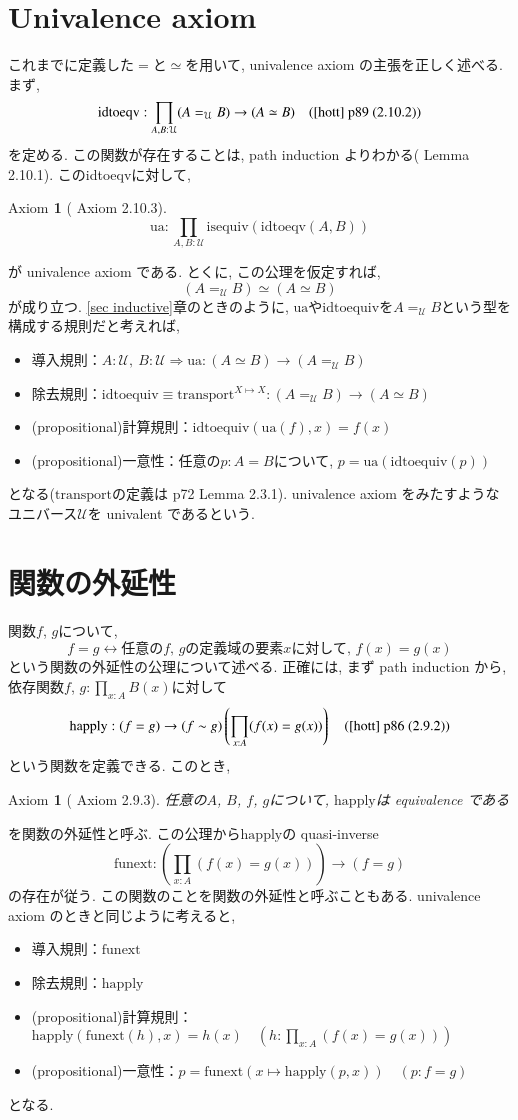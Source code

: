\documentclass[11pt]{jsreport}
\theoremstyle{mystyle}
\newtheorem{axi}[df]{$\textrm{Axiom}$}
\newcommand{\baxi}{\begin{shadebox} \begin{axi}}
\newcommand{\eaxi}{\end{axi} \end{shadebox}}
\newcommand{\Lra}{\Longrightarrow}
\newcommand{\lra}{\leftrightarrow}
\newcommand{\U}{\mathcal{U}}
\newcommand{\tp}{\textrm{transport}}
\newcommand{\iseq}{\textrm{isequiv}}
\newcommand{\0}{\textbf{0}}
\newcommand{\fune}{\textrm{funext}}
\newcommand{\happ}{\textrm{happly}}
\newcommand{\ua}{\textrm{ua}}
\newcommand{\ide}{\textrm{idtoequiv}}
\begin{document}
\section{Univalence axiom} \label{sec ua}
これまでに定義した$=$と$\simeq$を用いて, univalence axiom の主張を正しく述べる. まず, 
\[
  \textrm{idtoeqv} : \prod_{A, B : \U} (A =_{\U} B) \to (A \simeq B)
    \quad (\text{\cite{hott} p89 (2.10.2)})
\]
を定める. この関数が存在することは, path induction よりわかる(\cite{hott} Lemma 2.10.1). このidtoeqvに対して, 
\begin{shadebox}
\begin{axi}[\cite{hott} Axiom 2.10.3]
  \[
    \textrm{ua} : \prod_{A, B : \U} \iseq(\textrm{idtoeqv}(A, B))
  \]
\end{axi}
\end{shadebox}
が univalence axiom である. とくに, この公理を仮定すれば, 
\[
  (A =_{\U} B) \simeq (A \simeq B)
\]
が成り立つ. \ref{sec inductive}章のときのように, $\ua$や$\ide$を$A =_{\U} B$という型を構成する規則だと考えれば, 
\begin{itemize}
  \item 導入規則：$A : \U,\ B: \U \Lra \ua : (A \simeq B) \to (A =_{\U} B)$
  \item 除去規則：$\ide \equiv \tp^{X \mapsto X} : (A =_{\U} B) \to (A \simeq B)$
  \item (propositional)計算規則：$\ide (\ua (f), x) = f(x)$
  \item (propositional)一意性：任意の$p : A = B$について, $p = \ua (\ide (p))$
\end{itemize}
となる($\tp$の定義は\cite{hott} p72 Lemma 2.3.1). univalence axiom をみたすようなユニバース$\U$を univalent であるという.  
\section{関数の外延性} \label{sec funext}
関数$f$, $g$について, 
\[
  f = g \lra \text{任意の$f$, $g$の定義域の要素$x$に対して, $f(x) = g(x)$}
\]
という関数の外延性の公理について述べる. 正確には, まず path induction から, 
依存関数$f$, $g : \prod_{x : A} B(x)$に対して
\[
  \happ : (f = g) \to (f \sim g) \left( \prod_{x : A} (f(x) = g(x))\right)
    \quad (\text{\cite{hott} p86 (2.9.2)})
\]
という関数を定義できる. このとき, 
\baxi[\cite{hott} Axiom 2.9.3]
  任意の$A$, $B$, $f$, $g$について, $\happ$は equivalence である
\eaxi
を関数の外延性と呼ぶ. この公理から$\happ$の quasi-inverse
\[
  \textrm{funext} : \left( \prod_{x : A} (f(x) = g(x)) \right) \to (f = g)
\]
の存在が従う. この関数のことを関数の外延性と呼ぶこともある. univalence axiom のときと同じように考えると,
\begin{itemize}
  \item 導入規則：$\fune$
  \item 除去規則：$\happ$
  \item (propositional)計算規則：$\happ (\fune (h), x) = h(x)
    \quad \left(h : \prod_{x : A} (f(x) = g(x)) \right)$
  \item (propositional)一意性：$p = \fune (x \mapsto \happ(p, x)) \quad (p : f = g)$
\end{itemize}
となる. 
\end{document}
